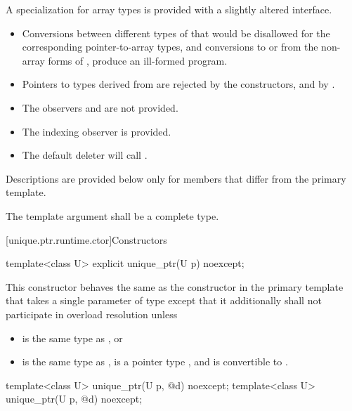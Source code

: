 \pnum
A specialization for array types is provided with a slightly altered
interface.

\begin{itemize}
\item Conversions between different types of
that would be disallowed for the corresponding pointer-to-array types,
and conversions to or from the non-array forms of
, produce an ill-formed program.

\item Pointers to types derived from  are
rejected by the constructors, and by .

\item The observers  and
 are not provided.

\item The indexing observer  is provided.

\item The default deleter will call .
\end{itemize}

\pnum
Descriptions are provided below only for members that
differ from the primary template.

\pnum
The template argument  shall be a complete type.

[unique.ptr.runtime.ctor]{Constructors}

%
\begin{itemdecl}
template<class U> explicit unique_ptr(U p) noexcept;
\end{itemdecl}

\begin{itemdescr}
\pnum
This constructor behaves the same as
the constructor in the primary template that
takes a single parameter of type 
except that it additionally
shall not participate in overload resolution unless
\begin{itemize}
\item {} is the same type as , or
\item {} is the same type as ,
 is a pointer type , and
 is convertible to .
\end{itemize}
\end{itemdescr}

%
\begin{itemdecl}
template<class U> unique_ptr(U p, @\seebelow@ d) noexcept;
template<class U> unique_ptr(U p, @\seebelow@ d) noexcept;
\end{itemdecl}

